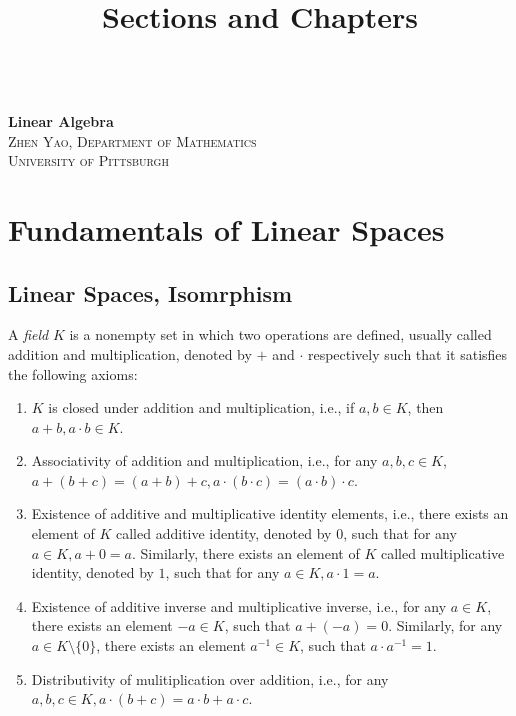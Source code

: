 \documentclass[11pt]{book}
\title{Sections and Chapters}
\theoremstyle{definition}
\numberwithin{equation}{chapter}
\begin{document}
\frontmatter

\begin{titlepage}
	\begin{center}
	\textbf{\LARGE{}} \\
	\vspace{40mm}
    \textbf{\LARGE{Linear Algebra}} \\
    \vspace{2mm} %
    \large{\textsc{Zhen Yao, Department of Mathematics}}\\
    \large{\textsc{University of Pittsburgh}}
    \end{center}
\end{titlepage}

\tableofcontents{}
\mainmatter

\newpage

\chapter{Fundamentals of Linear Spaces}
\section{Linear Spaces, Isomrphism}

A \emph{field} $K$ is a nonempty set in which two operations are defined, usually called addition and multiplication, denoted by $+$ and $\cdot$ respectively such that it satisfies the following axioms:
\begin{enumerate}[label=(\arabic*)]
    \item $K$ is closed under addition and multiplication, i.e., if $a,b\in K$, then $a+b, a\cdot b\in K$.
    \item Associativity of addition and multiplication, i.e., for any $a,b,c\in K$, $a+(b+c) = (a+b)+c, a\cdot(b\cdot c) = (a\cdot b)\cdot c$.
    \item Existence of additive and multiplicative identity elements, i.e., there exists an element of $K$ called additive identity, denoted by $0$, such that for any $a
    \in K, a+0=a$. Similarly, there exists an element of $K$ called multiplicative identity, denoted by $1$, such that for any $a\in K, a\cdot 1=a$.
    \item Existence of additive inverse and multiplicative inverse, i.e., for any $a\in K$, there exists an element $-a\in K$, such that $a+(-a)=0$. Similarly, for any $a\in K\setminus \{0\}$, there exists an element $a^{-1}\in K$, such that $a\cdot a^{-1}=1$.
    \item Distributivity of mulitiplication over addition, i.e., for any $a,b,c\in K, a\cdot(b+c)=a\cdot b+a\cdot c$.
\end{enumerate}
\end{document}
